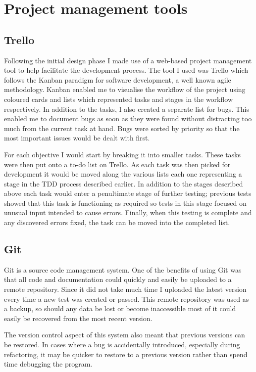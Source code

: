\section{Project management tools}

\subsection{Trello}

Following the initial design phase I made use of a web-based project management tool to help facilitate the development process. The tool I used was Trello which follows the Kanban paradigm for software development, a well known agile methodology. Kanban enabled me to visualise the workflow of the project using coloured cards and lists which represented tasks and stages in the workflow respectively. In addition to the tasks, I also created a separate list for bugs. This enabled me to document bugs as soon as they were found without distracting too much from the current task at hand. Bugs were sorted by priority so that the most important issues would be dealt with first.

For each objective I would start by breaking it into smaller tasks. These tasks were then put onto a to-do list on Trello. As each task was then picked for development it would be moved along the  various lists each one representing a stage in the TDD process described earlier.  In addition to the stages described above each task would enter a penultimate stage of further testing; previous tests showed that this task is functioning as required so tests in this stage focused on unusual input intended to cause errors. Finally, when this testing is complete and any discovered errors fixed, the task can be moved into the completed list.

\subsection{Git}

Git is a source code management system. One of the benefits of using Git was that all code and documentation could quickly and easily be uploaded to a remote repository. Since it did not take much time I uploaded the latest version every time a new test was created or passed. This remote repository was used as a backup, so should any data be lost or become inaccessible most of it could easily be recovered from the most recent version.

The version control aspect of this system also meant that previous versions can be restored. In cases  where a bug is accidentally introduced, especially during refactoring, it may be quicker to restore to a previous version rather than spend time debugging the program.

